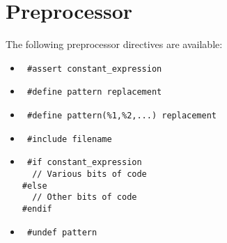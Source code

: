 \hypertarget{Small_Page_Small_Preprocessor_Section}{}\section{Preprocessor}\label{Small_Page_Small_Preprocessor_Section}
The following preprocessor directives are available: \begin{itemize}
\item 

\begin{Code}\begin{verbatim} #assert constant_expression 
\end{verbatim}
\end{Code}

 \item 

\begin{Code}\begin{verbatim} #define pattern replacement 
\end{verbatim}
\end{Code}

 \item 

\begin{Code}\begin{verbatim} #define pattern(%1,%2,...) replacement 
\end{verbatim}
\end{Code}

 \item 

\begin{Code}\begin{verbatim} #include filename 
\end{verbatim}
\end{Code}

 \item 

\begin{Code}\begin{verbatim} #if constant_expression
  // Various bits of code
#else
  // Other bits of code
#endif 
\end{verbatim}
\end{Code}

 \item 

\begin{Code}\begin{verbatim} #undef pattern 
\end{verbatim}
\end{Code}

 \end{itemize}
